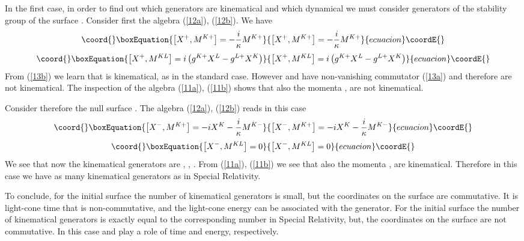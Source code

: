\documentclass [12pt]  {article}
\begin{document}
In the first case, in order to find out which generators are
kinematical and which dynamical we must consider generators of the
stability group of the surface \coordHE{}. Consider first the algebra
(\ref{12a}), (\ref{12b}). We have
\begin{equation}\coord{}\boxEquation{\label{13a}
\left[X^{+},M^{K+}\right]= -\frac{i}{\kappa}M^{K+}
}{\left[X^{+},M^{K+}\right]= -\frac{i}{\kappa}M^{K+}
}{ecuacion}\coordE{}\end{equation}
\begin{equation}\coord{}\boxEquation{\label{13b}
\left[X^{+},M^{KL}\right]=i\left(g^{K+}X^{L}-g^{L+}X^{K}\right)
}{\left[X^{+},M^{KL}\right]=i\left(g^{K+}X^{L}-g^{L+}X^{K}\right)
}{ecuacion}\coordE{}\end{equation}
From  (\ref{13b}) we learn that  \coordHE{} is kinematical, as in
the standard case. However \coordHE{} and \coordHE{} have
non-vanishing commutator (\ref{13a}) and therefore are not
kinematical. The inspection of the algebra (\ref{11a}),
(\ref{11b}) shows that also the momenta \coordHE{}, \coordHE{} are not
kinematical.

Consider therefore  the null surface \coordHE{}. The algebra
(\ref{12a}), (\ref{12b}) reads in this case
\begin{equation}\coord{}\boxEquation{\label{14a}
\left[X^{-},M^{K+}\right]=-i X^{K} -\frac{i}{\kappa}M^{K-}
}{\left[X^{-},M^{K+}\right]=-i X^{K} -\frac{i}{\kappa}M^{K-}
}{ecuacion}\coordE{}\end{equation}
\begin{equation}\coord{}\boxEquation{\label{14b}
\left[X^{-},M^{KL}\right]=0
}{\left[X^{-},M^{KL}\right]=0
}{ecuacion}\coordE{}\end{equation}
We see that now the kinematical generators are \coordHE{}, \coordHE{},
\coordHE{}. From (\ref{11a}), (\ref{11b}) we see that also the
momenta \coordHE{}, \coordHE{} are kinematical. Therefore in this case we
have  as many kinematical  generators as in Special Relativity.

To conclude, for the initial surface \coordHE{} the number of
kinematical generators is small, but the coordinates on the
surface are commutative. It is light-cone time \coordHE{} that is
non-commutative, and the light-cone energy can be associated with
the \coordHE{} generator. For the initial surface \coordHE{} the number of
kinematical generators is exactly equal to the corresponding
number in Special Relativity, but, the coordinates on the surface
are not commutative. In this case \coordHE{} and \coordHE{} play a role of
time and energy, respectively.
\end{document}
